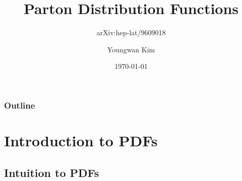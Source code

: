 \documentclass[aspectratio=169,xcolor=dvipsnames]{beamer}
\title[short title]{Parton Distribution Functions} %
\subtitle{arXiv:hep-lat/9609018 }
\author[Youngwan Kim] {Youngwan Kim}
\institute[SNUCMS] %
{
	Seoul National University\vskip0.05in
	SNUCMS arXiv Seminar
    \vskip 3pt
}
\date{\today} %
\begin{document}
\begin{frame}
    \titlepage
\end{frame}

\begin{frame}
	\frametitle{Outline}
	\tableofcontents
\end{frame}

\section{Introduction to PDFs}
\subsection{Intuition to PDFs}
\end{document}
